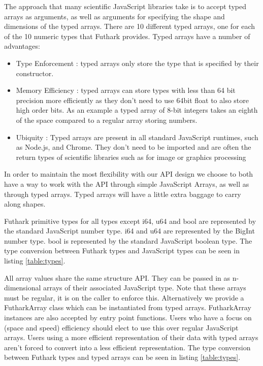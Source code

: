 \documentclass[11pt]{book}
\begin{document}
The approach that many scientific JavaScript libraries take is to accept typed arrays as arguments, as well as arguments for specifying the shape and dimensions of the typed arrays. There are 10 different typed arrays, one for each of the 10 numeric types that Futhark provides. Typed arrays have a number of advantages:

\begin{itemize}
    \item Type Enforcement : typed arrays only store the type that is specified by their constructor. 
    \item Memory Efficiency : typed arrays can store types with less than 64 bit precision more efficiently as they don't need to use 64bit float to also store high order bits. As an example a typed array of 8-bit integers takes an eighth of the space compared to a regular array storing numbers.
    \item Ubiquity : Typed arrays are present in all standard JavaScript runtimes, such as Node.js, and Chrome. They don't need to be imported and are often the return types of scientific libraries such as for image or graphics processing
\end{itemize}


In order to maintain the most flexibility with our API design we choose to both have a way to work with the API through simple JavaScript Arrays, as well as through typed arrays. Typed arrays will have a little extra baggage to carry along shapes.




Futhark primitive types for all types except i64, u64 and bool are represented by the standard JavaScript number type. i64 and u64 are represented by the BigInt number type. bool is represented by the standard JavaScript boolean type. The type conversion between Futhark types and JavaScript types can be seen in listing \ref{table:types}.

All array values share the same structure API. They can be passed in as n-dimensional arrays of their associated JavaScript type. Note that these arrays must be regular, it is on the caller to enforce this.
Alternatively we provide a FutharkArray class which can be instantiated from typed arrays. FutharkArray instances are also accepted by entry point functions. Users who have a focus on (space and speed) efficiency should elect to use this over regular JavaScript arrays. Users using a more efficient representation of their data with typed arrays aren't forced to convert into a less efficient representation. The type conversion between Futhark types and typed arrays can be seen in listing \ref{table:types}.
\end{document}

